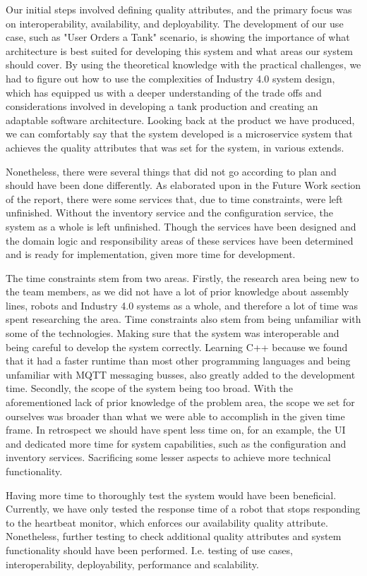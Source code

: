 
Our initial steps involved defining quality attributes, and the primary focus was on interoperability, availability, and deployability. The development of our use case, such as "User Orders a Tank" scenario, is showing the importance of what architecture is best suited for developing this system and what areas our system should cover. By using the theoretical knowledge with the practical challenges, we had to figure out how to use the complexities of Industry 4.0 system design, which has equipped us with a deeper understanding of the trade offs and considerations involved in developing a tank production and creating an adaptable software architecture. Looking back at the product we have produced, we can comfortably say that the system developed is a microservice system that achieves the quality attributes that was set for the system, in various extends.

Nonetheless, there were several things that did not go according to plan and should have been done differently.
As elaborated upon in the Future Work section of the report, there were some services that, due to time constraints, were left unfinished. Without the inventory service and the configuration service, the system as a whole is left unfinished. Though the services have been designed and the domain logic and responsibility areas of these services have been determined and is ready for implementation, given more time for development.

The time constraints stem from two areas.
Firstly, the research area being new to the team members, as we did not have a lot of prior knowledge about assembly lines, robots and Industry 4.0 systems as a whole, and therefore a lot of time was spent researching the area. Time constraints also stem from being unfamiliar with some of the technologies. Making sure that the system was interoperable and being careful to develop the system correctly. Learning C++ because we found that it had a faster runtime than most other programming languages\cite{876288} and being unfamiliar with MQTT messaging busses, also greatly added to the development time.
Secondly, the scope of the system being too broad. With the aforementioned lack of prior knowledge of the problem area, the scope we set for ourselves was broader than what we were able to accomplish in the given time frame. In retrospect we should have spent less time on, for an example, the UI and dedicated more time for system capabilities, such as the configuration and inventory services. Sacrificing some lesser aspects to achieve more technical functionality.

Having more time to thoroughly test the system would have been beneficial. Currently, we have only tested the response time of a robot that stops responding to the heartbeat monitor, which enforces our availability quality attribute. Nonetheless, further testing to check additional quality attributes and system functionality should have been performed. I.e. testing of use cases, interoperability, deployability, performance and scalability.

